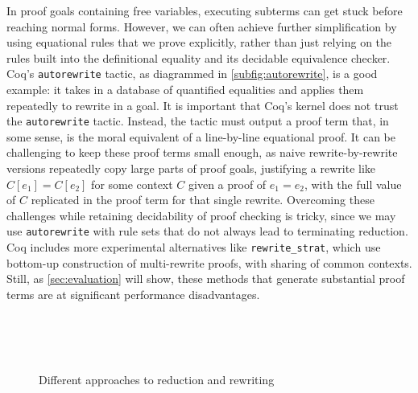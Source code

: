 \documentclass[sigplan,10pt,review,anonymous]{acmart}\settopmatter{printfolios=true,printccs=false,printacmref=false}
\begin{document}
In proof goals containing free variables, executing subterms can get stuck before reaching normal forms.
However, we can often achieve further simplification by using equational rules that we prove explicitly, rather than just relying on the rules built into the definitional equality and its decidable equivalence checker.
Coq's \texttt{autorewrite} tactic, as diagrammed in \autoref{subfig:autorewrite}, is a good example: it takes in a database of quantified equalities and applies them repeatedly to rewrite in a goal.
It is important that Coq's kernel does not trust the \texttt{autorewrite} tactic.
Instead, the tactic must output a proof term that, in some sense, is the moral equivalent of a line-by-line equational proof.
It can be challenging to keep these proof terms small enough, as naive rewrite-by-rewrite versions repeatedly copy large parts of proof goals, justifying a rewrite like $C[e_1] = C[e_2]$ for some context $C$ given a proof of $e_1 = e_2$, with the full value of $C$ replicated in the proof term for that single rewrite.
Overcoming these challenges while retaining decidability of proof checking is tricky, since we may use \texttt{autorewrite} with rule sets that do not always lead to terminating reduction.
Coq includes more experimental alternatives like \texttt{rewrite\_strat}, which use bottom-up construction of multi-rewrite proofs, with sharing of common contexts.
Still, as \autoref{sec:evaluation} will show, these methods that generate substantial proof terms are at significant performance disadvantages.

\begin{figure} \centering
   \\
   \\
   \\

  \caption{Different approaches to reduction and rewriting}
  \label{fig:trust}
\end{figure}
\end{document}
